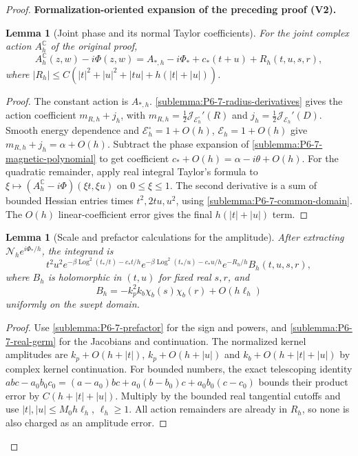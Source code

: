 \documentclass[11pt]{article}
\newtheorem{lemma}[theorem]{Lemma}
\newcommand{\formalisationparentid}{X}
\newenvironment{formalisationaddition}[1]{\par\medskip\begingroup\color{blue}\def\formalisationparentid{#1}\setcounter{formalizationsublemma}{0}\let\lemma\formalizationsublemma\let\endlemma\endformalizationsublemma
  \def\Eo{\mathcal E_h^\circ}\def\EE{\mathcal E_h}\def\phio{\phi_h^\circ}\def\phih{\phi_h}\def\Ho{H_h^{\rm atom}(v^\circ)}\def\Ha{H_h^{\rm atom}}\def\HL{H_h^{L}}\def\Dh{D_h}\def\Log{\operatorname{Log}}\def\ellh{\ell_h}\def\Gp{G_{p,h}}\def\Ast{A_{*,h}}\def\ahat{\widehat{\mathfrak a}_h}\def\ah{\mathfrak a_h}\def\rh{\widehat\rho_h}\def\deltah{\widehat\delta_h}\def\oldref##1{\textup{(##1)}}\def\interface##1{\par\noindent\textit{Analytical interface used here.} ##1\par}\def\finish{\par\noindent\textit{Conclusion of the formalization-oriented expansion.} }\par\noindent\textbf{Formalization-oriented expansion of the preceding proof (V2).}\par\smallskip
}{\par\endgroup\medskip
}
\newcommand{\C}{\mathbb C}
\newcommand{\cJ}{\mathcal J}
\begin{document}
\begin{proof}
\begin{formalisationaddition}{P6.7}
\begin{lemma}[Joint phase and its normal Taylor coefficients]\label{sublemma:P6-7-joint-phase}
For the joint complex action $A_h^\C$ of the original proof,
\[
 A_h^\C(z,w)-i\Phi(z,w)
     =A_{*,h}-i\Phi_*+c_*(t+u)+R_h(t,u,s,r),
\]
where
$|R_h|\le C(|t|^2+|u|^2+|tu|+h(|t|+|u|))$.
\end{lemma}
\begin{proof}
The constant action is $A_{*,h}$.
\ref{sublemma:P6-7-radius-derivatives} gives the action coefficient
$m_{R,h}+j_h$, with
$m_{R,h}=\frac12\cJ_{\Eo}'(R)$ and
$j_h=\frac12\cJ_{\EE}'(D)$.
Smooth energy dependence and $\Eo=1+O(h)$, $\EE=1+O(h)$ give
$m_{R,h}+j_h=\alpha+O(h)$.
Subtract the phase expansion of
\ref{sublemma:P6-7-magnetic-polynomial} to get coefficient
$c_*+O(h)=\alpha-i\theta+O(h)$.
For the quadratic remainder, apply real integral Taylor's formula to
$\xi\mapsto(A_h^\C-i\Phi)(\xi t,\xi u)$ on $0\le\xi\le1$.
The second derivative is a sum of bounded Hessian entries times
$t^2,2tu,u^2$, using \ref{sublemma:P6-7-common-domain}.
The $O(h)$ linear-coefficient error gives the final
$h(|t|+|u|)$ term.
\end{proof}

\begin{lemma}[Scale and prefactor calculations for the amplitude]\label{sublemma:P6-7-amplitude}
After extracting $\mathcal N_he^{i\Phi_*/h}$, the integrand is
\[
 t^2u^2e^{-\beta\Log^2(t_*/t)-c_*t/h}
       e^{-\beta\Log^2(t_*/u)-c_*u/h}e^{-R_h/h}B_h(t,u,s,r),
\]
where $B_h$ is holomorphic in $(t,u)$ for fixed real $s,r$, and
\[
 B_h=-k_p^2k_b\chi_b(s)\chi_b(r)+O(h\ell_h)
\]
uniformly on the swept domain.
\end{lemma}
\begin{proof}
Use \ref{sublemma:P6-7-prefactor} for the sign and powers, and
\ref{sublemma:P6-7-real-germ} for the Jacobians and continuation.
The normalized kernel amplitudes are
$k_p+O(h+|t|)$, $k_p+O(h+|u|)$ and
$k_b+O(h+|t|+|u|)$ by complex kernel continuation.
For bounded numbers, the exact telescoping identity
$abc-a_0b_0c_0=(a-a_0)bc+a_0(b-b_0)c+a_0b_0(c-c_0)$
bounds their product error by $C(h+|t|+|u|)$.
Multiply by the bounded real tangential cutoffs and use
$|t|,|u|\le M_0h\ell_h$, $\ell_h\ge1$.
All action remainders are already in $R_h$, so none is also charged
as an amplitude error.
\end{proof}


\end{formalisationaddition}
\end{proof}
\end{document}
